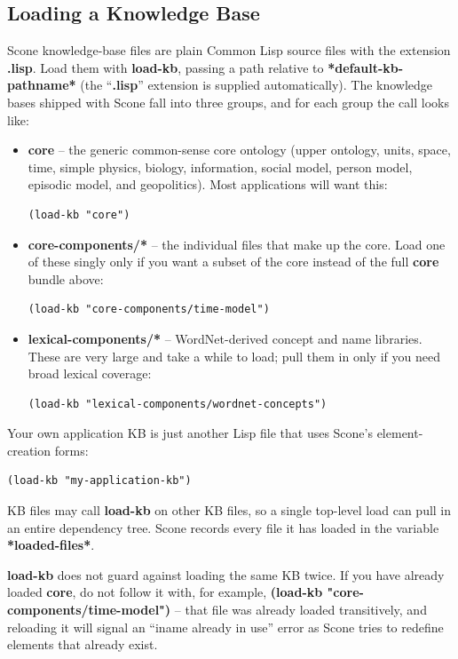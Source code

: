 \documentclass[titlepage,twoside,openright,11pt]{article}
\begin{document}
\subsection{Loading a Knowledge Base}\label{loading-a-knowledge-base}

Scone knowledge-base files are plain Common Lisp source files with the
extension \textbf{.lisp}. Load them with \textbf{load-kb}, passing a
path relative to \textbf{*default-kb-pathname*} (the ``\textbf{.lisp}''
extension is supplied automatically). The knowledge bases shipped with
Scone fall into three groups, and for each group the call looks like:

\begin{itemize}
\item
  \textbf{core} -- the generic common-sense core ontology (upper
  ontology, units, space, time, simple physics, biology, information,
  social model, person model, episodic model, and geopolitics). Most
  applications will want this:
  \begin{verbatim}
(load-kb "core")
  \end{verbatim}
\item
  \textbf{core-components/*} -- the individual files that make up the
  core. Load one of these singly only if you want a subset of the core
  instead of the full \textbf{core} bundle above:
  \begin{verbatim}
(load-kb "core-components/time-model")
  \end{verbatim}
\item
  \textbf{lexical-components/*} -- WordNet-derived concept and name
  libraries. These are very large and take a while to load; pull them
  in only if you need broad lexical coverage:
  \begin{verbatim}
(load-kb "lexical-components/wordnet-concepts")
  \end{verbatim}
\end{itemize}

Your own application KB is just another Lisp file that uses Scone's
element-creation forms:

\begin{verbatim}
(load-kb "my-application-kb")
\end{verbatim}

KB files may call \textbf{load-kb} on other KB files, so a single
top-level load can pull in an entire dependency tree. Scone records
every file it has loaded in the variable \textbf{*loaded-files*}.

\textbf{load-kb} does not guard against loading the same KB twice. If
you have already loaded \textbf{core}, do not follow it with, for
example, \textbf{(load-kb "core-components/time-model")} -- that file
was already loaded transitively, and reloading it will signal an
``iname already in use'' error as Scone tries to redefine elements
that already exist.
\end{document}
